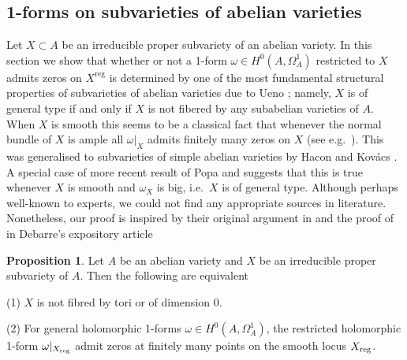 \documentclass[a4paper,12pt,reqno]{amsart}
\theoremstyle{plain}
\theoremstyle{definition}
\newtheorem{proposition}[theorem]{Proposition}
\theoremstyle{remark}
\DeclareMathOperator{\reg}{reg}
\begin{document}
\subsection{1-forms on subvarieties of abelian varieties}

Let $X\subset A$ be an irreducible proper subvariety of an abelian variety. In this section we show that whether or not a 1-form $\omega\in H^0(A,\Omega_A^1)$
restricted to $X$ admits zeros on $X^{\reg}$ is determined by one of the most fundamental
 structural properties of subvarieties of abelian varieties due to Ueno \cite[10.9]{Uen75};
 namely, 
$X$ is of general type if and only if $X$ is not fibered by any subabelian varieties of $A$. 
When $X$ is smooth 
this seems to be a classical fact that whenever the normal bundle of $X$ is ample all $\omega|_X$ admits finitely many zeros on $X$
(see e.g.\ \cite[Lemma 3.1]{Deb}). This was generalised to subvarieties of simple abelian varieties by 
Hacon and Kov\'acs \cite[Proposition 3.1]{HK05}. A special case of more recent result of Popa and \cite{PS14} suggests that this is true whenever $X$ is smooth and
$\omega_X$ is big,
i.e.\ $X$ is of general type. Although perhaps well-known to experts, we could not find any appropriate sources in literature. Nonetheless, our proof is inspired
by their original argument in\cite[Proposition 3.1]{HK05} and the proof of \cite[Lemma 3.1]{Deb} in Debarre's expository article

\begin{proposition}\label{van-nonsimple}
Let $A$ be an abelian variety and $X$ be an irreducible proper subvariety of $A$. Then the following are equivalent

(1) $X$ is not fibred by tori or of dimension 0. 

(2) For general holomorphic 1-forms $\omega\in H^0(A, \Omega_A^1)$, the restricted holomorphic 1-form $\omega|_{X_{\textnormal{reg}}}$ admit zeros at finitely many points on the smooth locus $X_{\textnormal{reg}}$.
\end{proposition}
\end{document}
